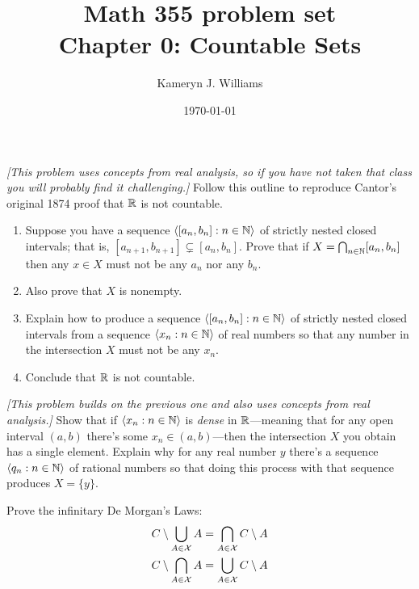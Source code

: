\documentclass[10pt]{amsart}
\title{Math 355 problem set \\ Chapter 0: Countable Sets}
\author{Kameryn J. Williams}
\date{\today}
\begin{document}
\maketitle


\begin{problem}
\emph{[This problem uses concepts from real analysis, so if you have not taken that class you will probably find it challenging.]}
Follow this outline to reproduce Cantor's original 1874 proof that $\mathbb{R}$ is not countable. 
\begin{enumerate}
\item Suppose you have a sequence ${\left\langle [a_n,b_n] : n \in \mathbb{N} \right\rangle}$ of strictly nested closed intervals; that is, $[a_{n+1},b_{n+1}] \subsetneq [a_n,b_n]$. Prove that if $X = \bigcap_{n \in \mathbb{N}} [a_n,b_n]$ then any $x \in X$ must not be any $a_n$ nor any $b_n$.
\item Also prove that $X$ is nonempty.
\item Explain how to produce a sequence ${\left\langle [a_n,b_n] : n \in \mathbb{N} \right\rangle}$ of strictly nested closed intervals from a sequence ${\left\langle x_n : n \in \mathbb{N} \right\rangle}$ of real numbers so that any number in the intersection $X$ must not be any $x_n$.
\item Conclude that $\mathbb{R}$ is not countable.
\end{enumerate}
\end{problem}

\begin{problem}
\emph{[This problem builds on the previous one and also uses concepts from real analysis.]}
Show that if ${\left\langle x_n : n \in \mathbb{N} \right\rangle}$ is \emph{dense} in $\mathbb{R}$---meaning that for any open interval $(a,b)$ there's some $x_n \in (a,b)$---then the intersection $X$ you obtain has a single element. Explain why for any real number $y$ there's a sequence ${\left\langle q_n : n \in \mathbb{N} \right\rangle}$ of rational numbers so that doing this process with that sequence produces $X = \{y\}$.
\end{problem}


\begin{problem}
Prove the infinitary De Morgan's Laws:
\begin{align*}
C \setminus \bigcup_{A \in \mathcal{X}} A &= \bigcap_{A \in \mathcal{X}} C \setminus A \\
C \setminus \bigcap_{A \in \mathcal{X}} A &= \bigcup_{A \in \mathcal{X}} C \setminus A \\
\end{align*}
\end{problem}
\end{document}
